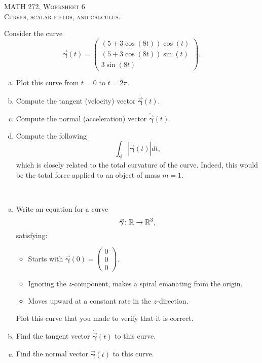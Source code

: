 \documentclass[12pt]{article} %
\newcommand{\curvegamma}{\boldsymbol{\vec{\gamma}}}
\newcommand{\tangentgamma}{\boldsymbol{\dot{\vec{\gamma}}}}
\newcommand{\normalgamma}{\boldsymbol{\ddot{\vec{\gamma}}}}
\begin{document}
\begin{center}
   \textsc{\large MATH 272, Worksheet 6}\\
   \textsc{Curves, scalar fields, and calculus.}
\end{center}
\vspace{.5cm}

\begin{problem}
    Consider the curve 
    \[
    \curvegamma(t) = \begin{pmatrix} (5+3\cos(8t))\cos(t) \\ (5+3\cos(8t))\sin(t) \\ 3\sin(8t) \end{pmatrix}.
    \]
    \begin{enumerate}[(a)]
        \item Plot this curve from $t=0$ to $t=2\pi$.
        \item Compute the tangent (velocity) vector $\tangentgamma(t)$.
        \item Compute the normal (acceleration) vector $\normalgamma(t)$.
        \item Compute the following 
        \[
        \int_{\curvegamma} \left| \normalgamma(t) \right| dt,
        \]
        which is closely related to the total curvature of the curve.  Indeed, this would be the total force applied to an object of mass $m=1$.
    \end{enumerate}
\end{problem}

\begin{problem}~
\begin{enumerate}[(a)]
\item Write an equation for a curve
\[
\curvegamma \colon \R \to \R^3,
\]
satisfying:
\begin{itemize}
    \item Starts with $\curvegamma(0)=\begin{pmatrix} 0 \\ 0 \\ 0 \end{pmatrix}$.
    \item Ignoring the $z$-component, makes a spiral emanating from the origin.
    \item Moves upward at a constant rate in the $z$-direction.
\end{itemize}
Plot this curve that you made to verify that it is correct.
\item Find the tangent vector $\tangentgamma(t)$ to this curve.
\item Find the normal vector $\normalgamma(t)$ to this curve.
\end{enumerate}
\end{problem}
\end{document}
